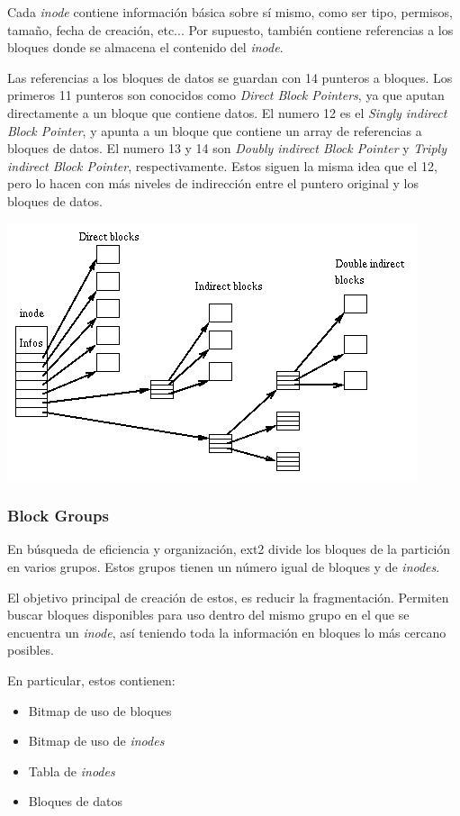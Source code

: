 \documentclass[a4paper,10pt]{article}
\begin{document}
Cada \textit{inode} contiene información básica sobre sí mismo, como ser tipo, permisos, tamaño, fecha de creación, etc...
Por supuesto, también contiene referencias a los bloques donde se almacena el contenido del \textit{inode}.

Las referencias a los bloques de datos se guardan con 14 punteros a bloques.
Los primeros 11 punteros son conocidos como \textit{Direct Block Pointers}, ya que aputan directamente a un bloque que contiene datos.
El numero 12 es el \textit{Singly indirect Block Pointer}, y apunta a un bloque que contiene un array de referencias a bloques de datos.
El numero 13 y 14 son \textit{Doubly indirect Block Pointer} y \textit{Triply indirect Block Pointer}, respectivamente.
Estos siguen la misma idea que el 12, pero lo hacen con más niveles de indirección entre el puntero original y los bloques de datos.

\begin{center}
 \includegraphics{./images/Ext2-inode.png}
\end{center}


\subsubsection{Block Groups}
En búsqueda de eficiencia y organización, ext2 divide los bloques de la partición en varios grupos.
Estos grupos tienen un número igual de bloques y de \textit{inodes}.

El objetivo principal de creación de estos, es reducir la fragmentación. 
Permiten buscar bloques disponibles para uso dentro del mismo grupo en el que se encuentra un \textit{inode}, así teniendo toda la información en bloques 
lo más cercano posibles.

En particular, estos contienen:
\begin{itemize}
\item Bitmap de uso de bloques
\item Bitmap de uso de \textit{inodes}
\item Tabla de \textit{inodes}
\item Bloques de datos
\end{itemize}
\end{document}
